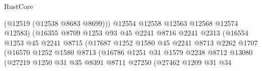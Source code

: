\begin{lexlean}{RustCore}
\begin{coremodule}
                                          (@12519 (@12538 @8683 @8699)))
                                        @12554
                                        @12558
                                        @12563
                                        @12568
                                        @12574
                                        @12583)
                                      (@16355
                                        @8709
                                        @1253
                                        @93
                                        @45
                                        @2241
                                        @8716
                                        @2241
                                        @2313
                                        (@16554
                                          @1253
                                          @45
                                          @2241
                                          @8715
                                          (@17687
                                            @1252
                                            @1580
                                            @45
                                            @2241
                                            @8713
                                            @2262
                                            @1707
                                            (@16570
                                              @1252
                                              @1580
                                              @8713
                                              (@16786
                                                @1251
                                                @31
                                                @1579
                                                @2238
                                                @8712
                                                @13080
                                                (@27219
                                                  @1250
                                                  @31
                                                  @35
                                                  @8391
                                                  @8711
                                                  @27250
                                                  (@27462
                                                    @1209
                                                    @31
                                                    @34

\end{coremodule}
\end{lexlean}
